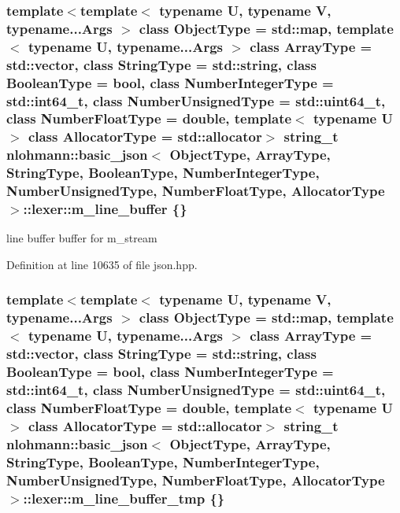 \hypertarget{classnlohmann_1_1basic__json_1_1lexer_a03a792a8f8e79e349678417e70607dbc}{}
\subsubsection[{m\+\_\+line\+\_\+buffer}]{\setlength{\rightskip}{0pt plus 5cm}template$<$template$<$ typename U, typename V, typename...\+Args $>$ class Object\+Type = std\+::map, template$<$ typename U, typename...\+Args $>$ class Array\+Type = std\+::vector, class String\+Type  = std\+::string, class Boolean\+Type  = bool, class Number\+Integer\+Type  = std\+::int64\+\_\+t, class Number\+Unsigned\+Type  = std\+::uint64\+\_\+t, class Number\+Float\+Type  = double, template$<$ typename U $>$ class Allocator\+Type = std\+::allocator$>$ {\bf string\+\_\+t} {\bf nlohmann\+::basic\+\_\+json}$<$ Object\+Type, Array\+Type, String\+Type, Boolean\+Type, Number\+Integer\+Type, Number\+Unsigned\+Type, Number\+Float\+Type, Allocator\+Type $>$\+::lexer\+::m\+\_\+line\+\_\+buffer \{\}\hspace{0.3cm}{\ttfamily [private]}}\label{classnlohmann_1_1basic__json_1_1lexer_a03a792a8f8e79e349678417e70607dbc}


line buffer buffer for m\+\_\+stream 



Definition at line 10635 of file json.\+hpp.

\hypertarget{classnlohmann_1_1basic__json_1_1lexer_acaf8fca0bf8dce1b3c89b5d41feeae08}{}
\subsubsection[{m\+\_\+line\+\_\+buffer\+\_\+tmp}]{\setlength{\rightskip}{0pt plus 5cm}template$<$template$<$ typename U, typename V, typename...\+Args $>$ class Object\+Type = std\+::map, template$<$ typename U, typename...\+Args $>$ class Array\+Type = std\+::vector, class String\+Type  = std\+::string, class Boolean\+Type  = bool, class Number\+Integer\+Type  = std\+::int64\+\_\+t, class Number\+Unsigned\+Type  = std\+::uint64\+\_\+t, class Number\+Float\+Type  = double, template$<$ typename U $>$ class Allocator\+Type = std\+::allocator$>$ {\bf string\+\_\+t} {\bf nlohmann\+::basic\+\_\+json}$<$ Object\+Type, Array\+Type, String\+Type, Boolean\+Type, Number\+Integer\+Type, Number\+Unsigned\+Type, Number\+Float\+Type, Allocator\+Type $>$\+::lexer\+::m\+\_\+line\+\_\+buffer\+\_\+tmp \{\}\hspace{0.3cm}{\ttfamily [private]}}\label{classnlohmann_1_1basic__json_1_1lexer_acaf8fca0bf8dce1b3c89b5d41feeae08}


